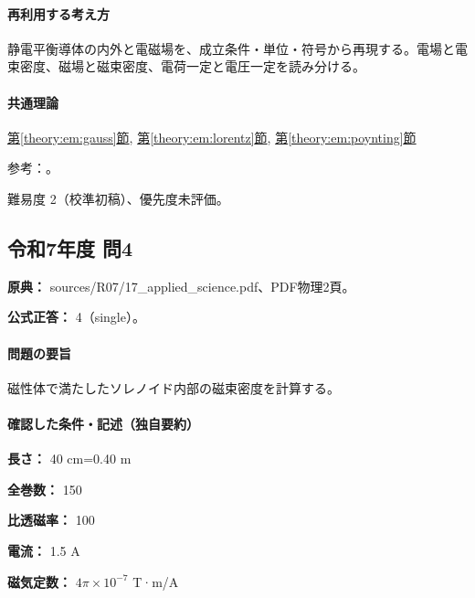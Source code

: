 \paragraph{再利用する考え方} 静電平衡導体の内外と電磁場を、成立条件・単位・符号から再現する。電場と電束密度、磁場と磁束密度、電荷一定と電圧一定を読み分ける。

\paragraph{共通理論} \hyperref[theory:em:gauss]{第\ref*{theory:em:gauss}節}, \hyperref[theory:em:lorentz]{第\ref*{theory:em:lorentz}節}, \hyperref[theory:em:poynting]{第\ref*{theory:em:poynting}節}

\par 参考：\cite{mit_em04,mit_em13,mit_lorentz}。

\par 難易度 2（校準初稿）、優先度未評価。

\subsection{令和7年度 問4}
\label{q:r07-reg-applied-04}

\noindent\textbf{原典：} sources/R07/17\_applied\_science.pdf、PDF物理2頁。

\textbf{公式正答：} 4（single）。

\paragraph{問題の要旨} 磁性体で満たしたソレノイド内部の磁束密度を計算する。

\paragraph{確認した条件・記述（独自要約）}\mbox{}\par

\noindent\textbf{長さ：} 40 cm=\allowbreak{}0.40 m\par

\noindent\textbf{全巻数：} 150\par

\noindent\textbf{比透磁率：} 100\par

\noindent\textbf{電流：} 1.5 A\par

\noindent\textbf{磁気定数：} \(4\pi\times10^{-7}\) T·m/A\par

